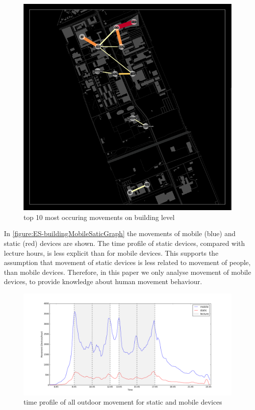 \begin{figure}[H]
\centering
\includegraphics[scale=0.2]{ES-mapTotal.png}
\captionsetup{justification=centering}
\caption{top 10 most occuring movements on building level}
\label{figure:ES-mapTotal}
\end{figure}

In \autoref{figure:ES-buildingMobileSaticGraph} the movements of mobile (blue) and static (red) devices are shown. The time profile of static devices, compared with lecture hours, is less explicit than for mobile devices. This supports the assumption that movement of static devices is less related to movement of people, than mobile devices. Therefore, in this paper we only analyse movement of mobile devices, to provide knowledge about human movement behaviour.

\begin{figure}[H]
\centering
\includegraphics[scale=0.2]{building_mobileStatic_graph.png}
\captionsetup{justification=centering}
\caption{time profile of all outdoor movement for static and mobile devices}
\label{figure:ES-buildingMobileSaticGraph}
\end{figure}


